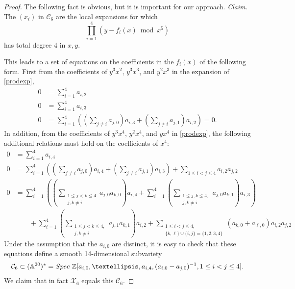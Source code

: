 \documentclass[10pt,a4paper]{amsart}
\newcommand{\A}{\mathbb{A}}
\newcommand{\ZZ}{\mathbb{Z}}
\begin{document}
\begin{proof}
The following fact is obvious, but it is important for our approach.
\vskip 10pt
\noindent
{\it Claim.}
The $(x_i)$ in $\mathcal{C}_6$ are the local expansions 
for which
\begin{equation}
\label{prodexp}
\prod_{i=1}^4 (y - f_i(x) \bmod x^5)
\end{equation}
has total degree $4$ in $x,y$.

\vskip 10pt
This leads to a set of equations on the coefficients in the $f_i(x)$ of the following form.  First from the coefficients of $y^3 x^2$, $y^3 x^3$, and $y^2 x^3$ in
the expansion of \eqref{prodexp},
\begin{align}
\label{Reiss4a}
0 &= \sum_{i=1}^4 a_{i,2} \nonumber \\
0 &= \sum_{i=1}^4 a_{i,3}  \\
0 &=\sum_{i=1}^4 \left(\left(\sum_{j \ne i} a_{j,0}\right) a_{i,3} + \left(\sum_{j\ne i} a_{j,1}\right) a_{i,2}\right) = 0. \nonumber
\end{align}
 In addition, from the coefficients of $y^3 x^4$, $y^2 x^4$, and $y x^4$ in \eqref{prodexp}, the following additional relations must hold on the coefficients of $x^4$:
\begin{align}
\label{Reiss4b}
0 &= \sum_{i=1}^4 a_{i,4} \nonumber \\
0 &= \sum_{i=1}^4 \left( \left(\sum_{j \ne i} a_{j,0}\right) a_{i,4} + \left(\sum_{j\ne i} a_{j,1}\right) a_{i,3} \right) + \sum_{1 \le i < j \le 4} a_{i,2} a_{j,2}  \\
0 &=\sum_{i=1}^4 \left(\left(\sum_{\substack{1 \le j < k \le 4\\  j,k \ne i}} a_{j,0} a_{k,0}\right) a_{i,4} + \sum_{i=1}^4 \left(\sum_{\substack{1 \le j,  k \le 4,\\  j,k \ne i}} a_{j,0} a_{k,1}\right) a_{i,3} \right) \nonumber\\ 
&\qquad + \sum_{i=1}^4 \left(\sum_{\substack{1 \le j < k \le 4,\\ j,k \ne i}} a_{j,1} a_{k,1} \right) a_{i,2} + \sum_{\substack{1 \le i < j \le 4,\\ \{k,\ell\} \cup \{i,j\} = \{1,2,3,4\} }} (a_{k,0} + a_{\ell,0}) a_{i,2} a_{j,2} \nonumber
\end{align}
Under the assumption that the $a_{i,0}$ are distinct, it is easy to check
that these equations define a smooth 14-dimensional subvariety 
$$\mathcal{C}_6 \subset (\A^{20})^* = {\rm Spec}\ \ZZ[a_{i,0}, \ldots, a_{i,4},  (a_{i,0} - a_{j,0})^{-1}, 1 \le i < j \le 4].$$  
We claim that in fact $\mathcal{X}_6$ equals this $\mathcal{C}_6$. 


\end{proof}
\end{document}
